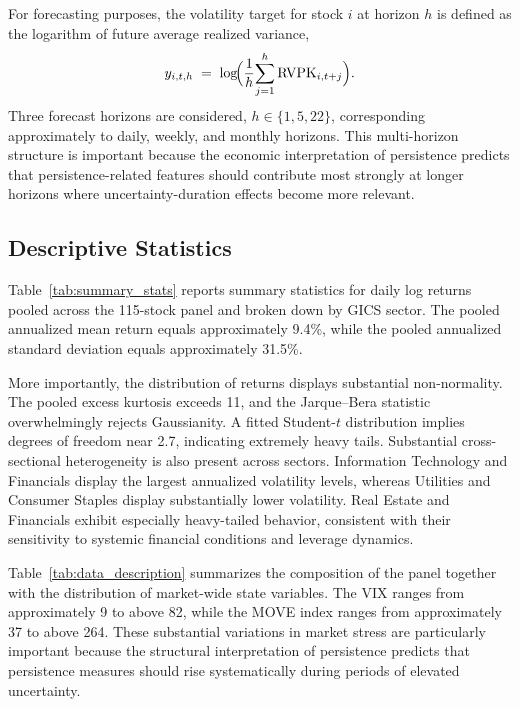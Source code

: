 \documentclass[unnumsec,webpdf,contemporary,large]{oup-authoring-template}%
\theoremstyle{thmstyleone}%
\theoremstyle{thmstyletwo}%
\theoremstyle{thmstylethree}%
\begin{document}
For forecasting purposes, the volatility target for stock $i$ at horizon
$h$ is defined as the logarithm of future average realized variance,
\begin{equation}
  y_{i,t,h} \;=\; \log\!\Bigl(\frac{1}{h}\!\sum_{j=1}^{h}
  \mathrm{RVPK}_{i,t+j}\Bigr).
\end{equation}
Three forecast horizons are considered, $h\in\{1,5,22\}$, corresponding
approximately to daily, weekly, and monthly horizons. This multi-horizon
structure is important because the economic interpretation of persistence
predicts that persistence-related features should contribute most strongly
at longer horizons where uncertainty-duration effects become more relevant.

\subsection{Descriptive Statistics}

Table~\ref{tab:summary_stats} reports summary statistics for daily log
returns pooled across the 115-stock panel and broken down by GICS sector.
The pooled annualized mean return equals approximately 9.4\%, while the
pooled annualized standard deviation equals approximately 31.5\%.

More importantly, the distribution of returns displays substantial
non-normality. The pooled excess kurtosis exceeds 11, and the Jarque--Bera
statistic overwhelmingly rejects Gaussianity. A fitted Student-$t$
distribution implies degrees of freedom near 2.7, indicating extremely
heavy tails. Substantial cross-sectional heterogeneity is also present
across sectors. Information Technology and Financials display the largest
annualized volatility levels, whereas Utilities and Consumer Staples
display substantially lower volatility. Real Estate and Financials exhibit
especially heavy-tailed behavior, consistent with their sensitivity to
systemic financial conditions and leverage dynamics.





Table~\ref{tab:data_description} summarizes the composition of the panel
together with the distribution of market-wide state variables. The VIX
ranges from approximately 9 to above 82, while the MOVE index ranges from
approximately 37 to above 264. These substantial variations in market
stress are particularly important because the structural interpretation of
persistence predicts that persistence measures should rise systematically
during periods of elevated uncertainty.
\end{document}
